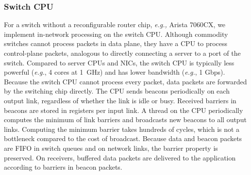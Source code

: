 
\subsubsection{Switch CPU}
\label{sec:commodity}

For a switch without a reconfigurable router chip, \textit{e.g.,} Arista 7060CX, we implement in-network processing on the switch CPU.
Although commodity switches cannot process packets in data plane, they have a CPU to process control-plane packets, analogous to directly connecting a server to a port of the switch.
Compared to server CPUs and NICs, the switch CPU is typically less powerful (\textit{e.g.}, 4 cores at 1~GHz) and has lower bandwidth (\textit{e.g.}, 1 Gbps).
Because the switch CPU cannot process every packet, data packets are forwarded by the switching chip directly. %
The CPU sends beacons periodically on each output link, regardless of whether the link is idle or busy.
Received barriers in beacons are stored in registers per input link.
A thread on the CPU periodically computes the minimum of link barriers and broadcasts new beacons to all output links.
Computing the minimum barrier takes hundreds of cycles, which is not a bottleneck compared to the cost of broadcast.
Because data and beacon packets are FIFO in switch queues and on network links, the barrier property is preserved. On receivers, buffered data packets are delivered to the application according to barriers in beacon packets.

